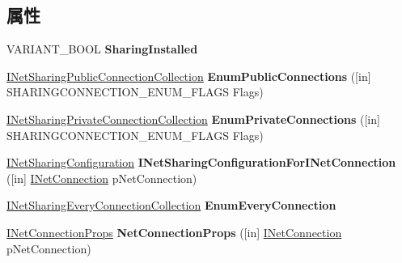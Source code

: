 \subsection*{属性}
\begin{DoxyCompactItemize}
\item 
\mbox{\label{interface_i_net_sharing_manager_a4e488bf59deef5d41115927396d6eafd}} 
V\+A\+R\+I\+A\+N\+T\+\_\+\+B\+O\+OL {\bfseries Sharing\+Installed}
\item 
\mbox{\label{interface_i_net_sharing_manager_a2f8e8141324619bedfb557da86d27c04}} 
\hyperlink{interface_i_net_sharing_public_connection_collection}{I\+Net\+Sharing\+Public\+Connection\+Collection} {\bfseries Enum\+Public\+Connections} (\mbox{[}in\mbox{]} S\+H\+A\+R\+I\+N\+G\+C\+O\+N\+N\+E\+C\+T\+I\+O\+N\+\_\+\+E\+N\+U\+M\+\_\+\+F\+L\+A\+GS Flags)
\item 
\mbox{\label{interface_i_net_sharing_manager_ac3d267adca87bbe1607f0dce8d4a6963}} 
\hyperlink{interface_i_net_sharing_private_connection_collection}{I\+Net\+Sharing\+Private\+Connection\+Collection} {\bfseries Enum\+Private\+Connections} (\mbox{[}in\mbox{]} S\+H\+A\+R\+I\+N\+G\+C\+O\+N\+N\+E\+C\+T\+I\+O\+N\+\_\+\+E\+N\+U\+M\+\_\+\+F\+L\+A\+GS Flags)
\item 
\mbox{\label{interface_i_net_sharing_manager_aa7e1a668ad5e135ddadd0d366373676e}} 
\hyperlink{interface_i_net_sharing_configuration}{I\+Net\+Sharing\+Configuration} {\bfseries I\+Net\+Sharing\+Configuration\+For\+I\+Net\+Connection} (\mbox{[}in\mbox{]} \hyperlink{interface_i_net_connection}{I\+Net\+Connection} p\+Net\+Connection)
\item 
\mbox{\label{interface_i_net_sharing_manager_a944f43b6f3eef15a950c5f3d02c3c508}} 
\hyperlink{interface_i_net_sharing_every_connection_collection}{I\+Net\+Sharing\+Every\+Connection\+Collection} {\bfseries Enum\+Every\+Connection}
\item 
\mbox{\label{interface_i_net_sharing_manager_a6f25f75c271b375514b24ff0945d7d03}} 
\hyperlink{interface_i_net_connection_props}{I\+Net\+Connection\+Props} {\bfseries Net\+Connection\+Props} (\mbox{[}in\mbox{]} \hyperlink{interface_i_net_connection}{I\+Net\+Connection} p\+Net\+Connection)
\end{DoxyCompactItemize}
